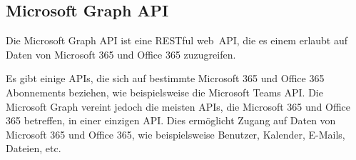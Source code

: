 \subsection{Microsoft Graph API}\label{subsec:microsoft-graph-api}
Die Microsoft Graph API ist eine \gls{RESTful} web~\gls{API}, die es einem erlaubt auf Daten von Microsoft 365 und Office 365 zuzugreifen.

Es gibt einige APIs, die sich auf bestimmte Microsoft 365 und Office 365 Abonnements beziehen, wie beispielsweise die Microsoft Teams API\@.
Die Microsoft Graph vereint jedoch die meisten APIs, die Microsoft 365 und Office 365 betreffen, in einer einzigen API\@.
Dies ermöglicht Zugang auf Daten von Microsoft 365 und Office 365, wie beispielsweise Benutzer, Kalender, E-Mails, Dateien, etc.


